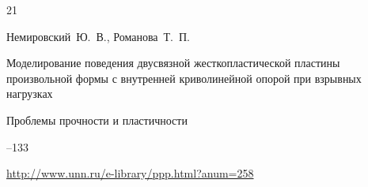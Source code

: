 \begin{thebibliography}{21}








\by Немировский~Ю.~В., Романова~Т.~П.

\paper Моделирование поведения двусвязной жесткопластической пластины произвольной формы с внутренней криволинейной опорой при взрывных нагрузках

\jour Проблемы прочности и пластичности



--133

\elink \url{http://www.unn.ru/e-library/ppp.html?anum=258}




















\end{thebibliography}
